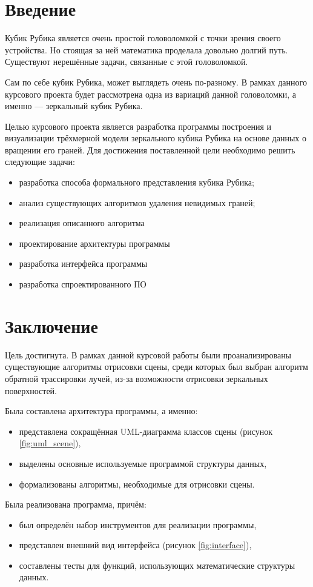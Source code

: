 


\tableofcontents
\section*{Введение}
Кубик Рубика является очень простой головоломкой с точки зрения своего устройства. Но стоящая за ней математика проделала довольно долгий путь. Существуют нерешённые задачи, связанные с этой головоломкой.

Сам по себе кубик Рубика, может выглядеть очень по-разному. В рамках данного курсового проекта будет рассмотрена одна из вариаций данной головоломки, а именно --- зеркальный кубик Рубика.

Целью курсового проекта является разработка программы построения и визуализации трёхмерной модели зеркального кубика Рубика на основе данных о вращении его граней. Для достижения поставленной цели необходимо решить следующие задачи:
\begin{itemize}
	\item разработка способа формального представления кубика Рубика;
	\item анализ существующих алгоритмов удаления невидимых граней;
	\item реализация описанного алгоритма
	\item проектирование архитектуры программы
	\item разработка интерфейса программы
	\item разработка спроектированного ПО
\end{itemize}






\section*{Заключение}
Цель достигнута. В рамках данной курсовой работы были проанализированы существующие алгоритмы отрисовки сцены, среди которых был выбран алгоритм обратной трассировки лучей, из-за возможности отрисовки зеркальных поверхностей.

Была составлена архитектура программы, а именно:
\begin{itemize}
	\item представлена сокращённая UML-диаграмма классов сцены (рисунок \ref{fig:uml_scene}),
	\item выделены основные используемые программой структуры данных,
	\item формализованы алгоритмы, необходимые для отрисовки сцены.
\end{itemize}

Была реализована программа, причём:
\begin{itemize}
	\item был определён набор инструментов для реализации программы,
	\item представлен внешний вид интерфейса (рисунок \ref{fig:interface}),
	\item составлены тесты для функций, использующих математические структуры данных.
\end{itemize}




